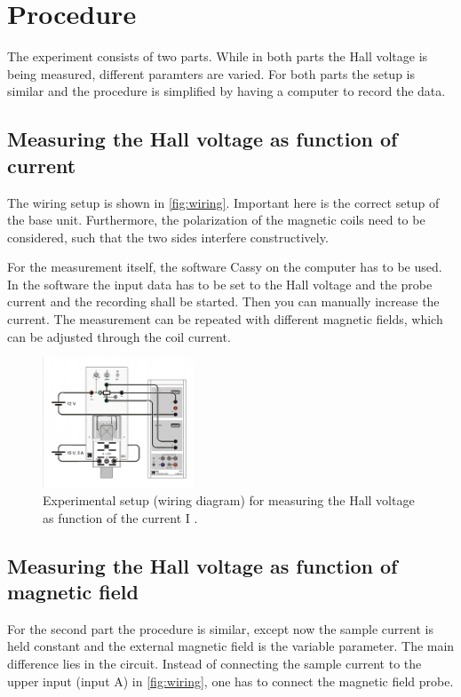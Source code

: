 \section{Procedure}
\label{sec:procedure}
The experiment consists of two parts. While in both parts the Hall voltage is being measured,
different paramters are varied. For both parts the setup is similar and the procedure is simplified
by having a computer to record the data.

\subsection{Measuring the Hall voltage as function of current}
\label{sec:procedure:a}
The wiring setup is shown in \autoref{fig:wiring}. Important here is the correct setup of the base
unit. Furthermore, the polarization of the magnetic coils need to be considered, such that the two
sides interfere constructively.

For the measurement itself, the software Cassy on the computer has to be used. In the software the
input data has to be set to the Hall voltage and the probe current and the recording shall be
started. Then you can manually increase the current. The measurement can be repeated with different
magnetic fields, which can be adjusted through the coil current.

\begin{figure}
  \centering
  \includegraphics[width=0.4\textwidth]{media/wiring.png}
  \caption{Experimental setup (wiring diagram) for measuring the Hall
            voltage as function of the current I \cite{leaflet}.}
  \label{fig:wiring}
\end{figure}

\subsection{Measuring the Hall voltage as function of magnetic
field}
\label{sec:procedure:b}
For the second part the procedure is similar, except now the sample current is held constant and the
external magnetic field is the variable parameter. The main difference lies in the circuit. Instead
of connecting the sample current to the upper input (input A) in \autoref{fig:wiring}, one has to
connect the magnetic field probe. 

